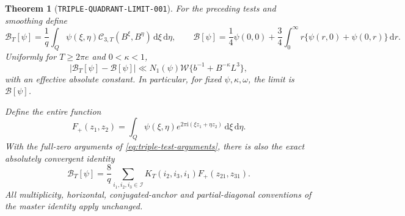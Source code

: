 \documentclass[11pt]{article}
\newtheorem{theorem}[lemma]{Theorem}
\newcommand{\ii}{\mathrm i}
\newcommand{\CT}{\mathcal C_{3,T}}
\newcommand{\dd}{\,\mathrm d}
\begin{document}
\begin{theorem}[\texttt{TRIPLE-QUADRANT-LIMIT-001}]
\label{thm:triple-quadrant-limit}
For the preceding tests and smoothing define
\[
 \mathcal B_T[\psi]=\frac1q\int_Q\psi(\xi,\eta)
                      \CT(B^\xi,B^\eta)\dd\xi\dd\eta,
 \qquad
 \mathcal B[\psi]=\frac14\psi(0,0)
       +\frac34\int_0^\infty r\{\psi(r,0)+\psi(0,r)\}\dd r.
\]
Uniformly for \(T\geq2\pi e\) and \(0<\kappa<1\),
\begin{equation}\label{eq:triple-quadrant-limit}
 |\mathcal B_T[\psi]-\mathcal B[\psi]|
 \ll N_1(\psi)\mathcal W
       \{b^{-1}+B^{-\kappa}L^3\},
\end{equation}
with an effective absolute constant. In particular, for fixed
\(\psi,\kappa,\omega\), the limit is \(\mathcal B[\psi]\).

Define the entire function
\[
 F_+(z_1,z_2)=\int_Q\psi(\xi,\eta)
                   e^{2\pi\ii(\xi z_1+\eta z_2)}\dd\xi\dd\eta.
\]
With the full-zero arguments of \eqref{eq:triple-test-arguments},
there is also the exact absolutely convergent identity
\begin{equation}\label{eq:triple-quadrant-zero-identity}
 \mathcal B_T[\psi]=\frac8q\sum_{i_1,i_2,i_3\in\mathcal I}
             K_T(i_2,i_3,i_1)F_+(z_{21},z_{31}).
\end{equation}
All multiplicity, horizontal, conjugated-anchor and partial-diagonal
conventions of the master identity apply unchanged.
\end{theorem}
\end{document}
